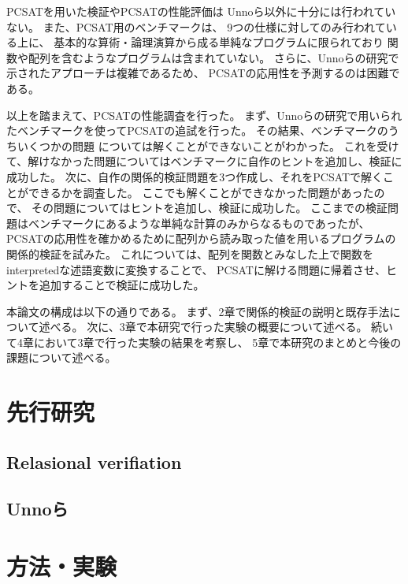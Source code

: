\documentclass[uplatex]{suribt}
\begin{document}
PCSATを用いた検証やPCSATの性能評価は
Unnoら以外に十分には行われていない。%
また、PCSAT用のベンチマークは、
9つの仕様に対してのみ行われている上に、
基本的な算術・論理演算から成る単純なプログラムに限られており
関数や配列を含むようなプログラムは含まれていない。
さらに、Unnoらの研究で示されたアプローチは複雑であるため、
PCSATの応用性を予測するのは困難である。%

以上を踏まえて、PCSATの性能調査を行った。
まず、Unnoらの研究で用いられたベンチマークを使ってPCSATの追試を行った。
その結果、ベンチマークのうちいくつかの問題 %
については解くことができないことがわかった。
これを受けて、解けなかった問題についてはベンチマークに自作のヒントを追加し、検証に成功した。
次に、自作の関係的検証問題を3つ作成し、それをPCSATで解くことができるかを調査した。
ここでも解くことができなかった問題があったので、%
その問題についてはヒントを追加し、検証に成功した。
ここまでの検証問題はベンチマークにあるような単純な計算のみからなるものであったが、
PCSATの応用性を確かめるために配列から読み取った値を用いるプログラムの関係的検証を試みた。
これについては、配列を関数とみなした上で関数をinterpretedな述語変数に変換することで、
PCSATに解ける問題に帰着させ、ヒントを追加することで検証に成功した。

本論文の構成は以下の通りである。
まず、2章で関係的検証の説明と既存手法について述べる。
次に、3章で本研究で行った実験の概要について述べる。
続いて4章において3章で行った実験の結果を考察し、
5章で本研究のまとめと今後の課題について述べる。

\chapter{先行研究}
\section{Relasional verifiation}
\section{Unnoら}

\chapter{方法・実験}
\end{document}
